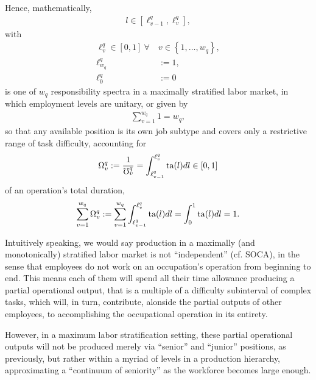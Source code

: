 \documentclass[hidelinks, nonatbib]{elsarticle}
\begin{document}
\begin{definition}
    \label{mmls_def}
    Hence, mathematically,
    \begin{gather}
    l \in \left[
    \ell_{v-1}^{q}
    ,
    \ell_{v}^{q}
    \right]
    ,
    \end{gather}
    with
    \begin{align}
    \ell_{v}^{q} \in [0,1]
    \
    \forall
    \
    &v \in 
    \left\{
        1, \dots, w_q
    \right\}
    ,
    \\
    \ell_{w_q}^{q}&:= 1
    ,
    \\
    \ell_{0}^{q} &:= 0
    \end{align}
    is one of $w_q$ responsibility spectra in a maximally stratified labor market, in which employment levels are unitary, or given by
    \begin{gather}
    \sum_{v=1}^{w_q}
    1
    =
    w_q
    ,
    \end{gather}
    so that any available position is its own job subtype and covers only a restrictive range of task difficulty, accounting for
    \begin{gather}
    \Omega_{v}^{q}
    := 
    \frac{1}{\mho_{v}^{q}}
    = 
    \int_{
        \ell_{v-1}^{q}
    }^{
        \ell_{v}^{q}
    }
    \text{ta}(l)dl
    \in [0,1]
    \end{gather}
    of an operation's total duration,
    \begin{gather}
    \sum_{v=1}^{w_q}
    \Omega_{v}^{q} 
    := 
    \sum_{v=1}^{w_q}
    \int_{
        \ell_{v-1}^{q}
    }^{
        \ell_{v}^{q}
    }
    \text{ta}(l)dl
    =
    \int_{0}^{1}
    \text{ta}(l)dl
    =
    1
    .
    \end{gather}
    
    Intuitively speaking, we would say production in a maximally (and monotonically) stratified labor market is not ``independent'' (cf. SOCA), in the sense that employees do not work on an occupation's operation from beginning to end. This means each of them will spend all their time allowance producing a partial operational output, that is a multiple of a difficulty subinterval of complex tasks, which will, in turn, contribute, alonside the partial outputs of other employees, to accomplishing the occupational operation in its entirety.
    
    However, in a maximum labor stratification setting, these partial operational outputs will not be produced merely via ``senior'' and ``junior'' positions, as previously, but rather within a myriad of levels in a production hierarchy, approximating a ``continuum of seniority'' as the workforce becomes large enough.
    

\end{definition}
\end{document}

